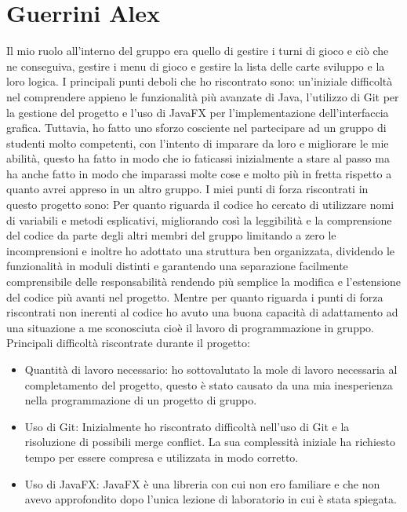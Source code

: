 \documentclass[a4paper,12pt]{report}
\begin{document}
\section{Guerrini Alex}
Il mio ruolo all'interno del gruppo era quello di gestire i turni di gioco e ciò che ne conseguiva, gestire i menu di gioco e gestire la lista delle carte sviluppo e la loro logica.
I principali punti deboli che ho riscontrato sono: un'iniziale difficoltà nel comprendere appieno le funzionalità più avanzate di Java, l'utilizzo di Git per la gestione del progetto e l'uso di JavaFX per l'implementazione dell'interfaccia grafica. Tuttavia, ho fatto uno sforzo cosciente nel partecipare ad un gruppo di studenti molto competenti, con l'intento di imparare da loro e migliorare le mie abilità, questo ha fatto in modo che io faticassi inizialmente a stare al passo ma ha anche fatto in modo che imparassi molte cose e molto più in fretta rispetto a quanto avrei appreso in un altro gruppo.
I miei punti di forza riscontrati in questo progetto sono:
Per quanto riguarda il codice  ho cercato di utilizzare nomi di variabili e metodi esplicativi, migliorando così la leggibilità e la comprensione del codice da parte degli altri membri del gruppo limitando a zero le incomprensioni e inoltre ho adottato una struttura ben organizzata, dividendo le funzionalità in moduli distinti e garantendo una separazione facilmente comprensibile delle responsabilità rendendo più semplice la modifica e l'estensione del codice più avanti nel progetto.
Mentre per quanto riguarda i punti di forza riscontrati non inerenti al codice ho avuto una buona capacità di adattamento ad una situazione a me sconosciuta cioè il lavoro di programmazione in gruppo.
Principali difficolt\`a riscontrate durante il progetto:
\begin{itemize}
    \item Quantità di lavoro necessario: ho sottovalutato la mole di lavoro necessaria al completamento del progetto, questo è stato causato da una mia inesperienza nella programmazione di un progetto di gruppo.
    \item Uso di Git: Inizialmente ho riscontrato difficoltà nell'uso di Git e la risoluzione di possibili merge conflict. La sua complessità iniziale ha richiesto tempo per essere compresa e utilizzata in modo corretto.
    \item Uso di JavaFX: JavaFX è una libreria con cui non ero familiare e che non avevo approfondito dopo l'unica lezione di laboratorio in cui è stata spiegata.
\end{itemize}
\end{document}
